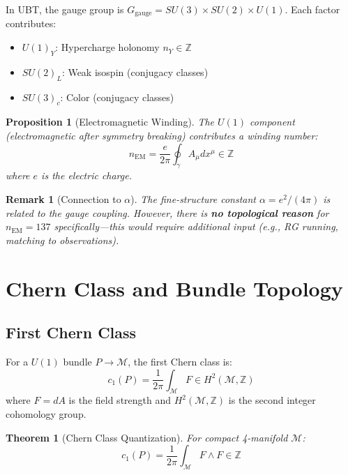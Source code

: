 \documentclass[12pt]{article}
\newtheorem{theorem}[definition]{Theorem}
\newtheorem{proposition}[definition]{Proposition}
\newtheorem{remark}[definition]{Remark}
\newcommand{\Z}{\mathbb{Z}}
\newcommand{\M}{\mathcal{M}}
\begin{document}
In UBT, the gauge group is $G_{\text{gauge}} = SU(3) \times SU(2) \times U(1)$. Each factor contributes:
\begin{itemize}
    \item $U(1)_Y$: Hypercharge holonomy $n_Y \in \Z$
    \item $SU(2)_L$: Weak isospin (conjugacy classes)
    \item $SU(3)_c$: Color (conjugacy classes)
\end{itemize}

\begin{proposition}[Electromagnetic Winding]
The $U(1)$ component (electromagnetic after symmetry breaking) contributes a winding number:
\begin{equation}
n_{\text{EM}} = \frac{e}{2\pi} \oint_\gamma A_\mu dx^\mu \in \Z
\end{equation}
where $e$ is the electric charge.
\end{proposition}

\begin{remark}[Connection to $\alpha$]
The fine-structure constant $\alpha = e^2/(4\pi)$ is related to the gauge coupling. However, there is \textbf{no topological reason} for $n_{\text{EM}} = 137$ specifically—this would require additional input (e.g., RG running, matching to observations).
\end{remark}

\section{Chern Class and Bundle Topology}
\label{sec:chern}

\subsection{First Chern Class}

For a $U(1)$ bundle $P \to \M$, the first Chern class is:
\begin{equation}
c_1(P) = \frac{1}{2\pi} \int_{\M} F \in H^2(\M, \Z)
\end{equation}
where $F = dA$ is the field strength and $H^2(\M, \Z)$ is the second integer cohomology group.

\begin{theorem}[Chern Class Quantization]
For compact 4-manifold $\M$:
\begin{equation}
c_1(P) = \frac{1}{2\pi} \int_{\M} F \wedge F \in \Z
\end{equation}
\end{theorem}
\end{document}
